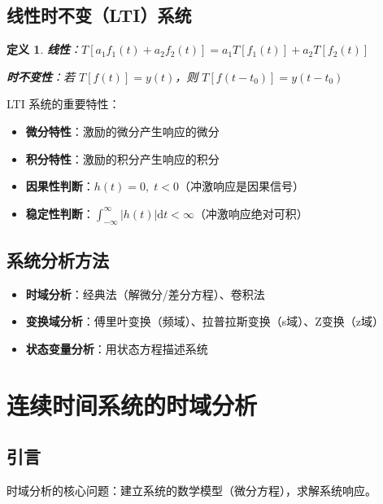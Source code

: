 \documentclass[11pt,a4paper]{ctexart}
\newtheorem{definition}{定义}[section]
\newcommand{\dd}{\mathrm{d}}            %
\begin{document}
\subsection{线性时不变（LTI）系统}

\begin{definition}
\textbf{线性}：$T[a_1 f_1(t) + a_2 f_2(t)] = a_1 T[f_1(t)] + a_2 T[f_2(t)]$

\textbf{时不变性}：若 $T[f(t)] = y(t)$，则 $T[f(t - t_0)] = y(t - t_0)$
\end{definition}

LTI 系统的重要特性：
\begin{itemize}
    \item \textbf{微分特性}：激励的微分产生响应的微分
    \item \textbf{积分特性}：激励的积分产生响应的积分
    \item \textbf{因果性判断}：$h(t) = 0,\; t < 0$（冲激响应是因果信号）
    \item \textbf{稳定性判断}：$\int_{-\infty}^{\infty} |h(t)|\dd t < \infty$（冲激响应绝对可积）
\end{itemize}

\subsection{系统分析方法}
\begin{itemize}
    \item \textbf{时域分析}：经典法（解微分/差分方程）、卷积法
    \item \textbf{变换域分析}：傅里叶变换（频域）、拉普拉斯变换（s域）、Z变换（z域）
    \item \textbf{状态变量分析}：用状态方程描述系统
\end{itemize}

\newpage
\section{连续时间系统的时域分析}

\subsection{引言}

时域分析的核心问题：建立系统的数学模型（微分方程），求解系统响应。
\end{document}
